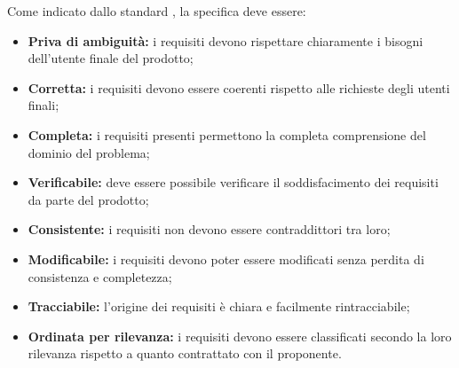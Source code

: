 \label{QualitàAnalisi}
Come indicato dallo standard , la specifica deve essere:
\begin{itemize}
	\item \textbf{Priva di ambiguità:} i requisiti devono rispettare chiaramente i bisogni dell'utente finale del prodotto;
	\item \textbf{Corretta:} i requisiti devono essere coerenti rispetto alle richieste degli utenti finali;
	\item \textbf{Completa:} i requisiti presenti permettono la completa comprensione del dominio del problema;
	\item \textbf{Verificabile:} deve essere possibile verificare il soddisfacimento dei requisiti da parte del prodotto;
	\item \textbf{Consistente:} i requisiti non devono essere contraddittori tra loro;
	\item \textbf{Modificabile:} i requisiti devono poter essere modificati senza perdita di consistenza e completezza;
	\item \textbf{Tracciabile:} l'origine dei requisiti è chiara e facilmente rintracciabile;
	\item \textbf{Ordinata per rilevanza:} i requisiti devono essere classificati secondo la loro rilevanza rispetto a quanto contrattato con il proponente.
\end{itemize}